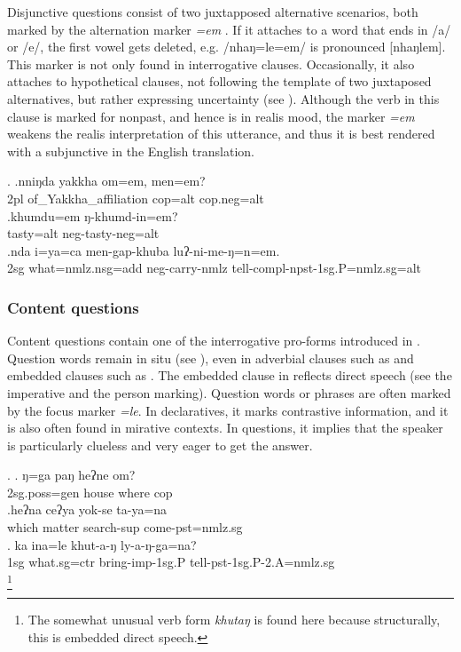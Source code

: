  Disjunctive questions consist of two juxtapposed alternative scenarios, both marked by the alternation marker \emph{=em} \Next. If it attaches to a word that ends in /a/ or /e/, the first vowel gets deleted, e.g. /nhaŋ=le=em/  is pronounced	[nhaŋlem]. This marker is not only found in interrogative clauses. Occasionally, it also attaches to hypothetical clauses, not following the template of two juxtaposed alternatives, but rather expressing uncertainty (see \Next[c]). Although the verb in this clause is marked for nonpast, and hence is in realis mood, the marker \emph{=em} weakens the realis interpretation of this utterance, and thus it is best rendered with a subjunctive in the English translation.
 
 \ex. \ag.nniŋda yakkha          om=em,    men=em?\\
 {\sc 2pl} of\_Yakkha\_affiliation {\sc cop=alt} {\sc cop.neg=alt}\\
  
 \bg.khumdu=em ŋ-khumd-in=em?\\
 tasty{\sc =alt} {\sc neg-}tasty{\sc -neg=alt}\\
 \bg.nda i=ya=ca men-gap-khuba luʔ-ni-me-ŋ=n=em.\\
 {\sc 2sg} what{\sc =nmlz.nsg=add} {\sc neg-}carry{\sc -nmlz} tell{\sc -compl-npst-1sg.P=nmlz.sg=alt}\\
  
 
\subsubsection{Content questions}

Content questions contain one of the interrogative pro-forms introduced in . Question words remain in situ (see \Next[a]), even in adverbial clauses such as \Next[b] and embedded clauses such as \Next[c]. The embedded clause in \Next[c] reflects direct speech (see the imperative and the person marking). Question words or phrases are often marked by the focus marker \emph{=le}. In declaratives, it marks contrastive information,  and it is also often found in mirative contexts. In questions, it implies that the speaker is particularly clueless and very eager to get the answer.

\ex. \ag. ŋ=ga          paŋ  heʔne om?\\
{\sc 2sg.poss=gen} house where {\sc cop}\\
 
\bg.heʔna ceʔya yok-se ta-ya=na\\
which  matter search{\sc -sup} come{\sc [3sg]-pst=nmlz.sg}\\
\bg. ka ina=le khut-a-ŋ ly-a-ŋ-ga=na?\\
{\sc 1sg} what{\sc .sg=ctr} bring{\sc -imp-1sg.P} tell{\sc -pst-1sg.P-2.A=nmlz.sg}\\
\footnote{The somewhat unusual verb form \emph{khutaŋ}  is found here because structurally, this is embedded direct speech.}


